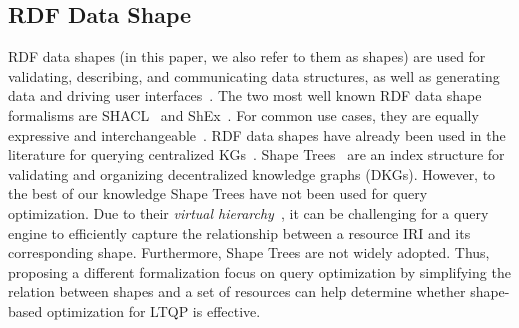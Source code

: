 \subsection{RDF Data Shape}
RDF data shapes (in this paper, we also refer to them as shapes) are used for validating, describing, and communicating data structures, as well as generating data and driving user interfaces~\cite{Gayo2018a,Gayo2018}.
The two most well known RDF data shape formalisms are SHACL~\cite{Gayo2018b} and ShEx~\cite{Gayo2018}.
For common use cases, they are equally expressive and interchangeable~\cite{Gayo2018c}.
RDF data shapes have already been used in the literature for querying centralized KGs~\cite{kashif2021}.
Shape Trees~\cite{shapetreesShapeTrees} are an index structure for validating and organizing decentralized knowledge graphs (DKGs).
However, to the best of our knowledge Shape Trees have not been used for query optimization. 
Due to their \emph{virtual hierarchy}~\cite{shapetreesShapeTrees}, it can be challenging for a query engine to efficiently capture the relationship between a resource IRI and its corresponding shape.
Furthermore, Shape Trees are not widely adopted.
Thus, proposing a different formalization focus on query optimization by simplifying the relation between shapes and a set of resources can help determine whether shape-based optimization for LTQP is effective.

\iffalse
\rt{
    The following paragraph needs to be better structured.
    There's a lot of stuff in there, but it's not very coherent.
    It's introduced as source selection, but that's not accurate, as you mention SERVICE (which is an operator in SPARQL), summarization techniques for query optimization, ... Y
    ou also mix sparql federation and link traversal. 
    And then you end with some centralized techniques. 
    You may even want to have separate subsections for some of these topics. 
    Also think about what point you want to make for each subsection, and how it relates to your work (and then also make this clear to the reader).
}
\fi

